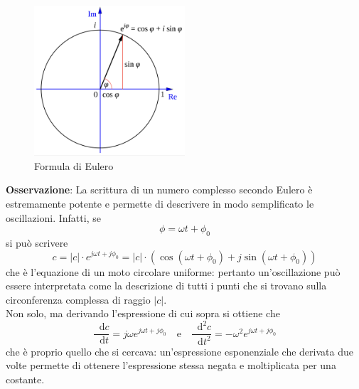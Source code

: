 \documentclass[a4paper]{extarticle}
\newcommand\dif{\mathop{}\!\mathrm{d}}
\begin{document}
\begin{figure}[H]
  \centering
  \includegraphics[width=0.5\textwidth]{formula_eulero.png}
  \caption{Formula di Eulero}
  \label{fig:formula_eulero}
\end{figure}

\vspace{1em}
\noindent
\textbf{Osservazione}: La scrittura di un numero complesso secondo Eulero è estremamente potente e permette di descrivere in modo semplificato le oscillazioni. Infatti, se
\[\phi=\omega t + \phi_0\]
si può scrivere
\[c=\vert c \vert \cdot e^{j\omega t + j \phi_0} = \vert c \vert \cdot \left(\cos(\omega t + \phi_0) + j \sin(\omega t + \phi_0)\right)\]
che è l'equazione di un moto circolare uniforme: pertanto un'oscillazione può essere interpretata come la descrizione di tutti i punti che si trovano sulla circonferenza complessa di raggio $\vert c \vert$.\\
Non solo, ma derivando l'espressione di cui sopra si ottiene che
\[\dfrac{\dif c}{\dif t} = j \omega e^{j\omega t + j \phi_0} \hspace{1em} \text{e} \hspace{1em} \dfrac{\dif^2 c}{\dif t^2} = - \omega^2 e^{j\omega t + j \phi_0}\]
che è proprio quello che si cercava: un'espressione esponenziale che derivata due volte permette di ottenere l'espressione stessa negata e moltiplicata per una costante.
\end{document}
